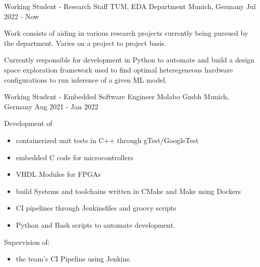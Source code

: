 
\begin{cventries}
  \cventry
    {Working Student - Research Staff} %
    {TUM, EDA Department} %
    {Munich, Germany} %
    {Jul 2022 - Now} %
    {
      \begin{cvitems} %
        \item {Work consists of aiding in various research projects currently being
               pursued by the department. Varies on a project to project basis.}
        \item {Currently responsible for development in Python to automate and build a design space exploration framework
               used to find optimal heteregeneous hardware configurations to run inference of a given ML model.}
      \end{cvitems}
    }
  \cventry
    {Working Student - Embedded Software Engineer} %
    {Molabo Gmbh} %
    {Munich, Germany} %
    {Aug 2021 - Jan 2022} %
    {
      \begin{cvitems} %
        \item {Development of}
            \begin{itemize}
                \item {containerized unit tests in C++ through gTest/GoogleTest}
                \item {embedded C code for microcontrollers}
                \item {VHDL Modules for FPGAs}
                \item {build Systems and toolchains written in CMake and Make using Dockers}
                \item {CI pipelines through Jenkinsfiles and groovy scripts}
                \item {Python and Bash scripts to automate development.}
            \end{itemize}
        \item {Supervision of:}
          \begin{itemize}
            \item {the team's CI Pipeline using Jenkins.}
          \end{itemize}
      \end{cvitems}
    }



\end{cventries}
